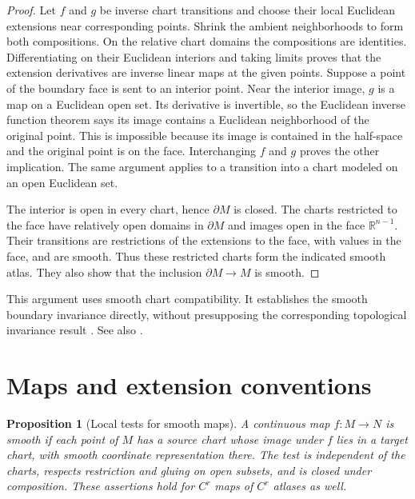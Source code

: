 \documentclass[11pt,oneside,openany]{book}
\newtheorem{proposition}[theorem]{Proposition}
\theoremstyle{definition}
\theoremstyle{remark}
\newcommand{\R}{\mathbb R}
\begin{document}
\begin{proof}
Let \(f\) and \(g\) be inverse chart transitions and choose their local
Euclidean extensions near corresponding points. Shrink the ambient
neighborhoods to form both compositions. On the relative chart
domains the compositions are identities. Differentiating on their
Euclidean interiors and taking limits proves that the extension
derivatives are inverse linear maps at the given points. Suppose a
point of the boundary face is sent to an interior point. Near the
interior image, \(g\) is a map on a Euclidean open set. Its derivative
is invertible, so the Euclidean inverse function theorem says its
image contains a Euclidean neighborhood of the original point. This
is impossible because its image is contained in the half-space and
the original point is on the face. Interchanging \(f\) and \(g\)
proves the other implication. The same argument applies to a
transition into a chart modeled on an open Euclidean set.

The interior is open in every chart, hence \(\partial M\) is closed.
The charts restricted to the face have relatively open domains in
\(\partial M\) and images open in the face \(\R^{n-1}\).
Their transitions are restrictions of the extensions to the
face, with values in the face, and are smooth. Thus these
restricted charts form the indicated smooth atlas. They also
show that the inclusion \(\partial M\to M\) is smooth.
\end{proof}

This argument uses smooth chart compatibility. It establishes the
smooth boundary invariance directly, without presupposing the
corresponding topological invariance result
\cite[Theorem~1.46]{lee}. See also \cite[Section~22]{tu}.

\section{Maps and extension conventions}

\begin{proposition}[Local tests for smooth maps]\label{p104:M01.05}
A continuous map \(f:M\to N\) is smooth if each point of \(M\) has a
source chart whose image under \(f\) lies in a target chart, with
smooth coordinate representation there. The test is independent of
the charts, respects restriction and gluing on open subsets, and is
closed under composition. These assertions hold for \(C^r\) maps of
\(C^r\) atlases as well.
\end{proposition}
\end{document}
